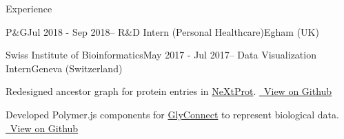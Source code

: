 \documentclass{resume} %
\begin{document}
\begin{rSection}{Experience}
\begin{rSubsection}{P\&G}{Jul 2018 - Sep 2018}{– R\&D Intern (Personal Healthcare)}{Egham (UK)}
\end{rSubsection}



\begin{rSubsection}{Swiss Institute of Bioinformatics}{May 2017 - Jul 2017}{– Data Visualization Intern}{Geneva (Switzerland)}
\item Redesigned ancestor graph for protein entries in \href{https://www.nextprot.org}{NeXtProt}. \fontsize{8pt}{12pt}\selectfont \href{https://github.com/universvm/nextprot-ancestor-graph}{ \faGithub \ View on Github}
\normalsize \item Developed Polymer.js components for
\href{https://glyconnect.expasy.org}{GlyConnect} to represent biological data.
\fontsize{8pt}{12pt}\selectfont
\href{https://github.com/universvm/glyco-balls}{ \faGithub \ View on Github}
\end{rSubsection}



\end{rSection}
\end{document}
